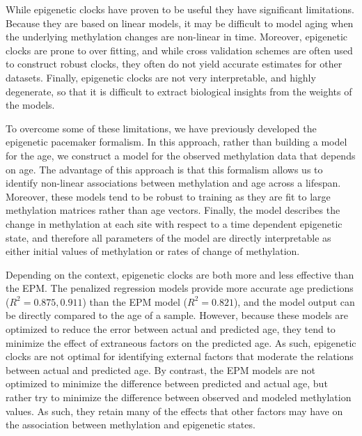 \documentclass{article}
\begin{document}
{\begin{linenumbers}
While epigenetic clocks have proven to be useful they have significant limitations.  Because they are based on linear 
models, it may be difficult to model aging when the underlying methylation changes are non-linear in time.  Moreover, 
epigenetic clocks are prone to over fitting, and while cross validation schemes are often used to construct 
robust clocks, they often do not yield accurate estimates for other datasets.  Finally, epigenetic clocks are not 
very interpretable, and highly degenerate, so that it is difficult to extract biological insights from the weights 
of the models.

To overcome some of these limitations, we have previously developed the epigenetic pacemaker formalism.  In this 
approach, rather than building a model for the age, we construct a model for the observed methylation data that 
depends on age.  The advantage of this approach is that this formalism allows us to identify non-linear associations 
between methylation and age across a lifespan.  Moreover, these models tend to be robust to training as they are fit 
to large methylation matrices rather than age vectors. Finally, the model describes the change in methylation at each 
site with respect to a time dependent epigenetic state, and therefore all parameters of the model are directly 
interpretable as either initial values of methylation or rates of change of methylation.

Depending on the context, epigenetic clocks are both more and less effective than the EPM. The penalized regression 
models provide more accurate age predictions ($R^2=0.875,0.911$) than the EPM model ($R^2=0.821$), and the model 
output can be directly compared to the age of a sample. However, because these models are optimized to reduce the 
error between actual and predicted age, they tend to minimize the effect of extraneous factors on the predicted age.  
As such, epigenetic clocks are not optimal for identifying external factors that moderate the relations between actual 
and predicted age.  By contrast, the EPM models are not optimized to minimize the difference between predicted and 
actual age, but rather try to minimize the difference between observed and modeled methylation values.  As such, they 
retain many of the effects that other factors may have on the association between methylation and epigenetic states.  


\end{linenumbers}}
\end{document}
